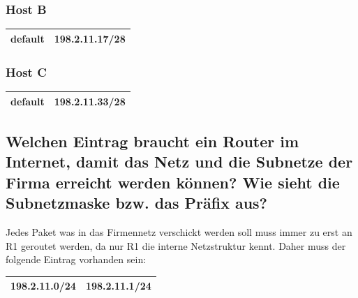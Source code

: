 \documentclass{article}
\begin{document}
\subsubsection*{Host B}

\begin{tabular}{|c|c|}
	\hline
	default & 198.2.11.17/28 \\
	\hline
\end{tabular}

\subsubsection*{Host C}

\begin{tabular}{|c|c|}
	\hline
	default & 198.2.11.33/28 \\
	\hline
\end{tabular}

\subsection{Welchen Eintrag braucht ein Router im Internet, damit das Netz und die Subnetze der Firma erreicht
werden können? Wie sieht die Subnetzmaske bzw. das Präfix aus?}

Jedes Paket was in das Firmennetz verschickt werden soll muss immer zu erst an R1 geroutet werden, da nur R1 die
interne Netzstruktur kennt. Daher muss der folgende Eintrag vorhanden sein:

\vspace{1em}

\begin{tabular}{|c|c|}
	\hline
	198.2.11.0/24 & 198.2.11.1/24 \\
	\hline
\end{tabular}
\end{document}
